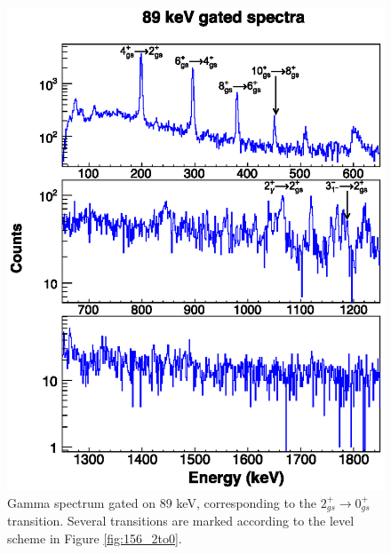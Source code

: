 \begin{figure}
    \includegraphics[scale=1.3]{156GdTablesAndFigs/89_gamma.eps}
    \caption{Gamma spectrum gated on 89 keV, corresponding to the $2^+_{gs}\rightarrow 0^+_{gs}$ transition. Several transitions are marked according to the level scheme in Figure \ref{fig:156_2to0}.}
    \label{fig:156_2to0spec}
\end{figure}